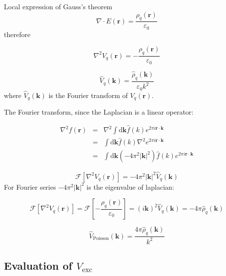 Local expression of Gauss's theorem 
\begin{equation}
\nabla\cdot E(\mathbf{r})=\frac{\rho_{q}(\mathbf{r})}{\varepsilon_{0}}
\end{equation}
therefore

\begin{equation}
\nabla^{2}V_{q}(\mathbf{r})=-\frac{\rho_{q}(\mathbf{r})}{\varepsilon_{0}}
\end{equation}


\begin{equation}
\hat{V}_{q}(\mathbf{k})=\frac{\hat{\rho}_{q}(\mathbf{k})}{\varepsilon_{0}k^{2}}
\end{equation}
where $\hat{V}_{q}(\mathbf{k})$ is the Fourier transform of $V_{q}(\mathbf{r})$.

The Fourier transform, since the Laplacian is a linear operator:

\begin{eqnarray}
\nabla^{2}f(\mathbf{r}) & = & \nabla^{2}\int\mathrm{d}\mathbf{k}\hat{f}(k)e^{2\pi i\mathbf{r}\cdot\mathbf{k}}\\
 & = & \int\mathrm{d}\mathbf{k}\hat{f}(k)\nabla^{2}e^{2\pi i\mathbf{r}\cdot\mathbf{k}}\\
 & = & \int\mathrm{d}\mathbf{k}\left(-4\pi^{2}\left|\mathbf{k}\right|^{2}\right)\hat{f}(k)e^{2\pi i\mathbf{r}\cdot\mathbf{k}}
\end{eqnarray}


\begin{equation}
\mathcal{F}\left[\nabla^{2}V_{q}(\mathbf{r})\right]=-4\pi^{2}\left|\mathbf{k}\right|^{2}\hat{V}_{q}(\mathbf{k})
\end{equation}
For Fourier series $-4\pi^{2}\left|\mathbf{k}\right|^{2}$ is the
eigenvalue of laplacian:

\begin{equation}
\mathcal{F}\left[\nabla^{2}V_{q}(\mathbf{r})\right]=\mathcal{F}\left[-\frac{\rho_{q}(\mathbf{r})}{\varepsilon_{0}}\right]=\left(i\mathbf{k}\right)^{2}\hat{V}_{q}(\mathbf{k})=-4\pi\hat{\rho}_{q}(\mathbf{k})
\end{equation}


\begin{equation}
\hat{V}_{\mathrm{Poisson}}(\mathbf{k})=\frac{4\pi\hat{\rho}_{q}(\mathbf{k})}{k^{2}}
\end{equation}



\subsection{Evaluation of $V_{\mathrm{exc}}$}

